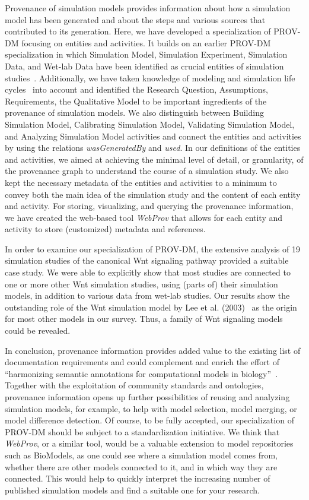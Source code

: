 \documentclass[10pt,letterpaper]{article}
\newcommand{\webprov}{\textit{WebProv}}
\newcommand{\wnt}{Wnt}
\newcommand{\lee}{Lee et al. (2003)}
\newcommand{\RQ}{Research Question}
\newcommand{\As}{Assumptions}
\newcommand{\Rs}{Requirements}
\newcommand{\QM}{Qualitative Model}
\newcommand{\SM}{Simulation Model}
\newcommand{\SE}{Simulation Experiment}
\newcommand{\SD}{Simulation Data}
\newcommand{\WD}{Wet-lab Data}
\newcommand{\BSM}{Building Simulation Model}
\newcommand{\CSM}{Calibrating Simulation Model}
\newcommand{\VSM}{Validating Simulation Model}
\newcommand{\ASM}{Analyzing Simulation Model}
\begin{document}
Provenance of simulation models provides information about how a simulation model has been generated and about the steps and various sources that contributed to its generation.
Here, we have developed a specialization of PROV-DM focusing on entities and activities.
It builds on an earlier PROV-DM specialization in which \SM{}, \SE{}, \SD{}, and \WD{} have been identified as crucial entities of simulation studies~\cite{Ruscheinski2018}.
Additionally, we have taken knowledge of modeling and simulation life cycles~\cite{Balci2012} into account and identified the \RQ{}, \As{}, \Rs{}, the \QM{} to be important ingredients of the provenance of simulation models.
We also distinguish between \BSM{}, \CSM{}, \VSM{}, and \ASM{} activities and connect the entities and activities by using the relations \textit{wasGeneratedBy} and \textit{used}.
In our definitions of the entities and activities, we aimed at achieving the minimal level of detail, or granularity, of the provenance graph to understand the course of a simulation study.
We also kept the necessary metadata of the entities and activities to a minimum to convey both the main idea of the simulation study and the content of each entity and activity.
For storing, visualizing, and querying the provenance information, we have created the web-based tool \webprov{} that allows for each entity and activity to store (customized) metadata and references.

In order to examine our specialization of PROV-DM, the extensive analysis of 19 simulation studies of the canonical \wnt{} signaling pathway provided a suitable case study.
We were able to explicitly show that most studies are connected to one or more other \wnt{} simulation studies, using (parts of) their simulation models, in addition to various data from wet-lab studies.
Our results show the outstanding role of the \wnt{} simulation model by \lee{}~\cite{Lee2003} as the origin for most other models in our survey.
Thus, a family of \wnt{} signaling models could be revealed.

In conclusion, provenance information provides added value to the existing list of documentation requirements and could complement and enrich the effort of \enquote{harmonizing semantic annotations for computational models in biology}~\cite{Neal2019}.
Together with the exploitation of community standards and ontologies, provenance information opens up further possibilities of reusing and analyzing simulation models, for example, to help with model selection, model merging, or model difference detection.
Of course, to be fully accepted, our specialization of PROV-DM should be subject to a standardization initiative.
We think that \webprov{}, or a similar tool, would be a valuable extension to model repositories such as BioModels, as one could see where a simulation model comes from, whether there are other models connected to it, and in which way they are connected.
This would help to quickly interpret the increasing number of published simulation models and find a suitable one for your research.
\end{document}
